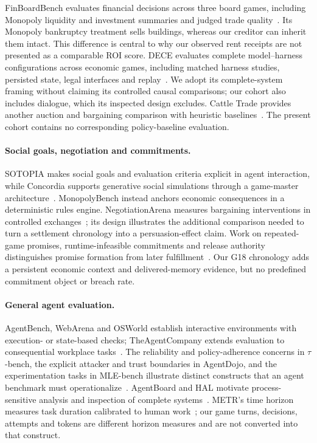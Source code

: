 FinBoardBench evaluates financial decisions across three board games, including Monopoly liquidity and investment summaries and judged trade quality~\cite{hu2026finboardbench}. Its Monopoly bankruptcy treatment sells buildings, whereas our creditor can inherit them intact. This difference is central to why our observed rent receipts are not presented as a comparable ROI score. DECE evaluates complete model--harness configurations across economic games, including matched harness studies, persisted state, legal interfaces and replay~\cite{zhang2026dece}. We adopt its complete-system framing without claiming its controlled causal comparisons; our cohort also includes dialogue, which its inspected design excludes. Cattle Trade provides another auction and bargaining comparison with heuristic baselines~\cite{muller2026cattletrade}. The present cohort contains no corresponding policy-baseline evaluation.

\paragraph{Social goals, negotiation and commitments.}
SOTOPIA makes social goals and evaluation criteria explicit in agent interaction, while Concordia supports generative social simulations through a game-master architecture~\cite{zhou2024sotopia,vezhnevets2023concordia}. MonopolyBench instead anchors economic consequences in a deterministic rules engine. NegotiationArena measures bargaining interventions in controlled exchanges~\cite{bianchi2024negotiationarena}; its design illustrates the additional comparison needed to turn a settlement chronology into a persuasion-effect claim. Work on repeated-game promises, runtime-infeasible commitments and release authority distinguishes promise formation from later fulfillment~\cite{shi2026cheaptalk,shi2026agentslie,empty_commitments_v2,commitment_standing}. Our G18 chronology adds a persistent economic context and delivered-memory evidence, but no predefined commitment object or breach rate.

\paragraph{General agent evaluation.}
AgentBench, WebArena and OSWorld establish interactive environments with execution- or state-based checks; TheAgentCompany extends evaluation to consequential workplace tasks~\cite{liu2024agentbench,zhou2024webarena,xie2024osworld,xu2025theagentcompany}. The reliability and policy-adherence concerns in $\tau$-bench, the explicit attacker and trust boundaries in AgentDojo, and the experimentation tasks in MLE-bench illustrate distinct constructs that an agent benchmark must operationalize~\cite{yao2025taubench,debenedetti2024agentdojo,chan2025mlebench}. AgentBoard and HAL motivate process-sensitive analysis and inspection of complete systems~\cite{ma2024agentboard,kapoor2026hal}. METR's time horizon measures task duration calibrated to human work~\cite{kwa2025timehorizons}; our game turns, decisions, attempts and tokens are different horizon measures and are not converted into that construct.

